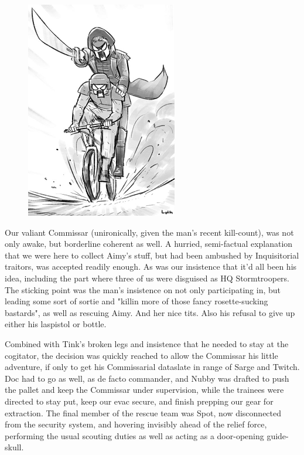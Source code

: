 \begin{figure}
	\begin{center}
		\includegraphics[width=\figwidth]{pics/21/101.png}
	\end{center}
\end{figure}
Our valiant Commissar (unironically, given the man's recent kill-count), was not only awake, but borderline coherent as well. 
A hurried, semi-factual explanation that we were here to collect Aimy's stuff, but had been ambushed by Inquisitorial traitors, was accepted readily enough. 
As was our insistence that it'd all been his idea, including the part where three of us were disguised as HQ Stormtroopers. 
The sticking point was the man's insistence on not only participating in, but leading some sort of sortie and "killin more of those fancy rosette-sucking bastards", as well as rescuing Aimy. 
And her nice tits. 
Also his refusal to give up either his laspistol or bottle.

Combined with Tink's broken legs and insistence that he needed to stay at the cogitator, the decision was quickly reached to allow the Commissar his little adventure, if only to get his Commissarial dataslate in range of Sarge and Twitch. 
Doc had to go as well, as de facto commander, and Nubby was drafted to push the pallet and keep the Commissar under supervision, while the trainees were directed to stay put, keep our evac secure, and finish prepping our gear for extraction. 
The final member of the rescue team was Spot, now disconnected from the security system, and hovering invisibly ahead of the relief force, performing the usual scouting duties as well as acting as a door-opening guide-skull.

